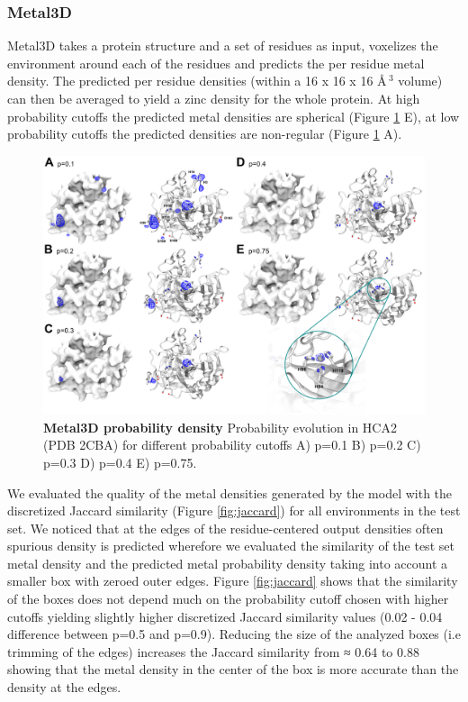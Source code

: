 \documentclass[ lineno,
  9pt]{elife}
\begin{document}
\hypertarget{metal3d}{%
\subsubsection{Metal3D}\label{metal3d}}

Metal3D takes a protein structure and a set of residues as input, voxelizes the environment around each of the residues and predicts the per residue metal density. The predicted per residue densities (within a 16 x 16 x 16 \AA\,$^3$ volume) can then be averaged to yield a zinc density for the whole protein. At high probability cutoffs the predicted metal densities are spherical (Figure \ref{fig:2cbaprobabilities} E), at low probability cutoffs the predicted densities are non-regular (Figure \ref{fig:2cbaprobabilities} A).

\begin{figure}
\hypertarget{fig:2cbaprobabilities}{%
\centering
\includegraphics{images/2CBA_probabilities.png}
\caption{\textbf{Metal3D probability density} Probability evolution in HCA2 (PDB 2CBA) for different probability cutoffs A) p=0.1 B) p=0.2 C) p=0.3 D) p=0.4 E) p=0.75.}\label{fig:2cbaprobabilities}
}
\end{figure}

We evaluated the quality of the metal densities generated by the model with the discretized Jaccard similarity (Figure \ref{fig:jaccard}) for all environments in the test set. We noticed that at the edges of the residue-centered output densities often spurious density is predicted wherefore we evaluated the similarity of the test set metal density and the predicted metal probability density taking into account a smaller box with zeroed outer edges. Figure \ref{fig:jaccard} shows that the similarity of the boxes does not depend much on the probability cutoff chosen with higher cutoffs yielding slightly higher discretized Jaccard similarity values (0.02 - 0.04 difference between p=0.5 and p=0.9). Reducing the size of the analyzed boxes (i.e trimming of the edges) increases the Jaccard similarity from ≈ 0.64 to 0.88 showing that the metal density in the center of the box is more accurate than the density at the edges.
\end{document}
